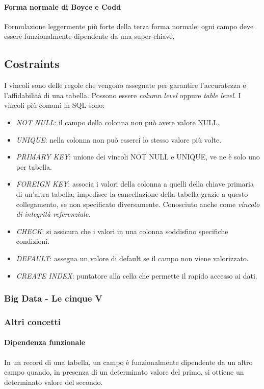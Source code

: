 \documentclass{article}
\begin{document}
            \paragraph{Forma normale di Boyce e Codd} Formulazione leggermente più forte della terza forma normale: ogni campo deve essere funzionalmente dipendente da una super-chiave.
        \subsection{Costraints}
            I vincoli sono delle regole che vengono assegnate per garantire l'accuratezza e l'affidabilità di una tabella. Possono essere \textit{column level} oppure \textit{table level}. I vincoli più comuni in SQL sono:
            \begin{itemize}
                \item \textit{NOT NULL}: il campo della colonna non può avere valore NULL.
                \item \textit{UNIQUE}: nella colonna non può esserci lo stesso valore più volte.
                \item \textit{PRIMARY KEY}: unione dei vincoli NOT NULL e UNIQUE, ve ne è solo uno per tabella.
                \item \textit{FOREIGN KEY}: associa i valori della colonna a quelli della chiave primaria di un'altra tabella; impedisce la cancellazione della tabella grazie a questo collegamento, se non specificato diversamente. Conosciuto anche come \textit{vincolo di integrità referenziale}.
                \item \textit{CHECK}: si assicura che i valori in una colonna soddisfino specifiche condizioni.
                \item \textit{DEFAULT}: assegna un valore di default se il campo non viene valorizzato.
                \item \textit{CREATE INDEX}: puntatore alla cella che permette il rapido accesso ai dati.
            \end{itemize}
        \subsubsection{Big Data - Le cinque V}
        \subsubsection{Altri concetti}
            \paragraph{Dipendenza funzionale} In un record di una tabella, un campo è funzionalmente dipendente da un altro campo quando, in presenza di un determinato valore del primo, si ottiene un determinato valore del secondo.
\end{document}
